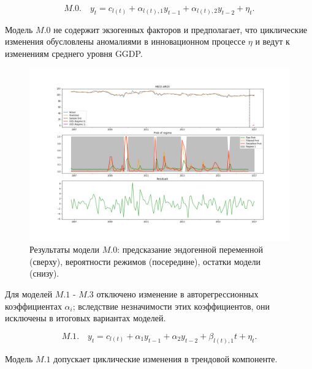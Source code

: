 \documentclass[a4paper,14pt]{extreport}
\begin{document}
\begin{equation}
	M.0. \quad y_t = c_{l(t)} + \alpha_{l(t), 1} y_{t-1} + \alpha_{l(t), 2} y_{t-2} + \eta_t .
\end{equation}

Модель $M.0$ не содержит экзогенных факторов и предполагает, что циклические изменения обусловлены аномалиями в инновационном процессе $\eta$ и ведут к изменениям среднего уровня GGDP.

\begin{figure}[H]
	\includegraphics[width=\linewidth]{img/manual/model_m0.png}
	\caption{
		Результаты модели $M.0$: предсказание эндогенной переменной (сверху), вероятности режимов (посередине), остатки модели (снизу).
	}
	\label{fig:sm_model_m0}
\end{figure}

Для моделей $M.1$ - $M.3$ отключено изменение в авторегрессионных коэффициентах $\alpha_i$; вследствие незначимости этих коэффициентов, они исключены в итоговых вариантах моделей.


\begin{equation}	
	M.1. \quad y_t = c_{l(t)} + \alpha_1 y_{t-1} + \alpha_2 y_{t-2} + \beta_{l(t), 1} t + \eta_t .
\end{equation}

Модель $M.1$ допускает циклические изменения в трендовой компоненте. 
\end{document}
